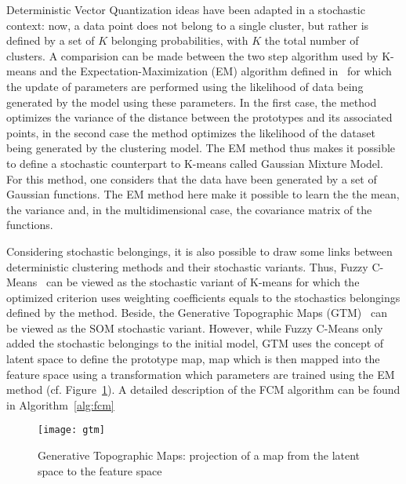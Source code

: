    Deterministic Vector Quantization ideas have been adapted in a stochastic context: now, a data point does not belong to a single cluster, but rather is defined by a set of $K$ belonging probabilities, with $K$ the total number of clusters. A comparision can be made between the two step algorithm used by K-means and the Expectation-Maximization (EM) algorithm defined in~\cite{dempster1977maximum} for which the update of parameters are performed using the likelihood of data being generated by the model using these parameters. In the first case, the method optimizes the variance of the distance between the prototypes and its associated points, in the second case the method optimizes the likelihood of the dataset being generated by the clustering model. The EM method thus makes it possible to define a stochastic counterpart to K-means called Gaussian Mixture Model. For this method, one considers that the data have been generated by a set of Gaussian functions. The EM method here make it possible to learn the the mean, the variance and, in the multidimensional case, the covariance matrix of the functions.
    
    Considering stochastic belongings, it is also possible to draw some links between deterministic clustering methods and their stochastic variants. Thus, Fuzzy C-Means~\cite{bezdek1984fcm} can be viewed as the stochastic variant of K-means for which the optimized criterion uses weighting coefficients equals to the stochastics belongings defined by the method. Beside, the Generative Topographic Maps (GTM)~\cite{bishop1998gtm} can be viewed as the SOM stochastic variant. However, while Fuzzy C-Means only added the stochastic belongings to the initial model, GTM uses the concept of latent space to define the prototype map, map which is then mapped into the feature space using a transformation which parameters are trained using the EM method (cf. Figure~\ref{fig:gtm}). A detailed description of the FCM algorithm can be found in Algorithm~\ref{alg:fcm}

        \vspace{0.8cm}
   
        \begin{figure}[h]
            \centering
            \texttt{[image: gtm]}
            \caption{Generative Topographic Maps: projection of a map from the latent space to the feature space}
\label{fig:gtm}
        \end{figure}

